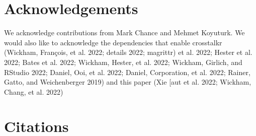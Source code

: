 \documentclass{article}
\begin{document}
\hypertarget{acknowledgements}{%
\section{Acknowledgements}\label{acknowledgements}}

We acknowledge contributions from Mark Chance and Mehmet Koyuturk. We
would also like to acknowledge the dependencies that enable crosstalkr
(Wickham, François, et al. 2022; details 2022; magrittr) et al. 2022;
Hester et al. 2022; Bates et al. 2022; Wickham, Hester, et al. 2022;
Wickham, Girlich, and RStudio 2022; Daniel, Ooi, et al. 2022; Daniel,
Corporation, et al. 2022; Rainer, Gatto, and Weichenberger 2019) and
this paper (Xie {[}aut et al. 2022; Wickham, Chang, et al. 2022)

\hypertarget{citations}{%
\section*{Citations}\label{citations}}
\end{document}
